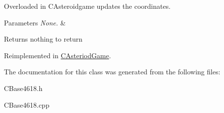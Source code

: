 Overloaded in C\+Asteroidgame updates the coordinates. 


\begin{DoxyParams}{Parameters}
{\em None.} & \\
\hline
\end{DoxyParams}
\begin{DoxyReturn}{Returns}
nothing to return 
\end{DoxyReturn}


Reimplemented in \hyperlink{class_c_asteriod_game_abe38958a37bed1b2ed5f9b08bc0332bb}{C\+Asteriod\+Game}.



The documentation for this class was generated from the following files\+:\begin{DoxyCompactItemize}
\item 
C\+Base4618.\+h\item 
C\+Base4618.\+cpp\end{DoxyCompactItemize}
